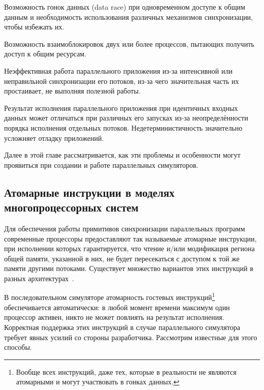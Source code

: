 \begin{enumerate*}
    \item Возможность гонок данных (\abbr data race) при одновременном доступе к общим данным и необходимость использования различных механизмов синхронизации, чтобы избежать их.
    \item Возможность взаимоблокировок двух или более процессов, пытающих получить доступ к общим ресурсам.
    \item Неэффективная работа параллельного приложения из-за интенсивной или неправильной синхронизации его потоков, из-за чего значительная часть их простаивает, не выполняя полезной работы.
    \item Результат исполнения параллельного приложения при идентичных входных данных может отличаться при различных его запусках из-за неопределённости порядка исполнения отдельных потоков. Недетерминистичность значительно усложняет отладку приложений.
\end{enumerate*}

Далее в этой главе рассматривается, как эти проблемы и особенности могут проявиться при создании и работе параллельных симуляторов.

\subsection[Атомарные инструкции]{Атомарные инструкции в моделях многопроцессорных систем}\label{sec:atomics}

Для обеспечения работы примитивов синхронизации параллельных программ современные процессоры предоставляют так называемые атомарные инструкции, при исполнении которых гарантируется, что чтение и/или модификация региона общей памяти, указанной в них, не будет пересекаться с доступом к той же памяти другими потоками. Существует множество вариантов этих инструкций в разных архитектурах~\cite{habr-atomics, habr-lock-free}. 

В последовательном симуляторе атомарность гостевых инструкций\footnote{Вообще всех инструкций, даже тех, которые в реальности не являются атомарными и могут участвовать в гонках данных.} обеспечивается автоматически: в любой момент времени максимум один процессор активен, никто не может повлиять на результат исполнения. Корректная поддержка этих инструкций в случае параллельного симулятора требует явных усилий со стороны разработчика. Рассмотрим известные для этого способы.

